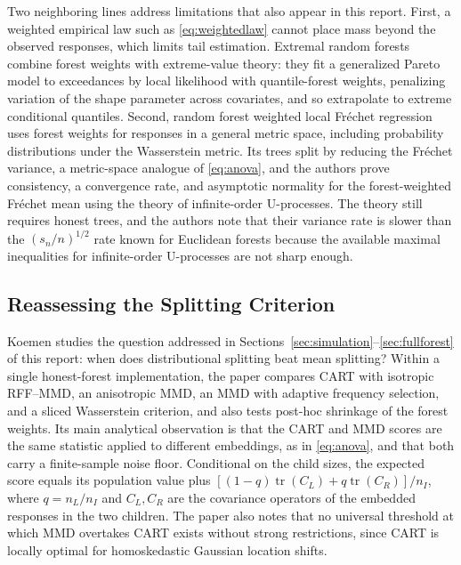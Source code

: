 \documentclass[12pt,a4paper]{article}
\newcommand{\1}{\mathbf 1}
\begin{document}
Two neighboring lines address limitations that also appear in this report. First, a weighted empirical law such as \eqref{eq:weightedlaw} cannot place mass beyond the observed responses, which limits tail estimation. Extremal random forests \cite{gnecco2024} combine forest weights with extreme-value theory: they fit a generalized Pareto model to exceedances by local likelihood with quantile-forest weights, penalizing variation of the shape parameter across covariates, and so extrapolate to extreme conditional quantiles. Second, random forest weighted local Fr\'echet regression \cite{qiu2024} uses forest weights for responses in a general metric space, including probability distributions under the Wasserstein metric. Its trees split by reducing the Fr\'echet variance, a metric-space analogue of \eqref{eq:anova}, and the authors prove consistency, a convergence rate, and asymptotic normality for the forest-weighted Fr\'echet mean using the theory of infinite-order U-processes. The theory still requires honest trees, and the authors note that their variance rate is slower than the $(s_n/n)^{1/2}$ rate known for Euclidean forests because the available maximal inequalities for infinite-order U-processes are not sharp enough.

\subsection{Reassessing the Splitting Criterion}\label{sec:splitstudy}
Koemen \cite{koemen2026} studies the question addressed in Sections~\ref{sec:simulation}--\ref{sec:fullforest} of this report: when does distributional splitting beat mean splitting? Within a single honest-forest implementation, the paper compares CART with isotropic RFF--MMD, an anisotropic MMD, an MMD with adaptive frequency selection, and a sliced Wasserstein criterion, and also tests post-hoc shrinkage of the forest weights. Its main analytical observation is that the CART and MMD scores are the same statistic applied to different embeddings, as in \eqref{eq:anova}, and that both carry a finite-sample noise floor. Conditional on the child sizes, the expected score equals its population value plus $[(1-q)\operatorname{tr}(C_L)+q\operatorname{tr}(C_R)]/n_I$, where $q=n_L/n_I$ and $C_L,C_R$ are the covariance operators of the embedded responses in the two children. The paper also notes that no universal threshold at which MMD overtakes CART exists without strong restrictions, since CART is locally optimal for homoskedastic Gaussian location shifts.
\end{document}
